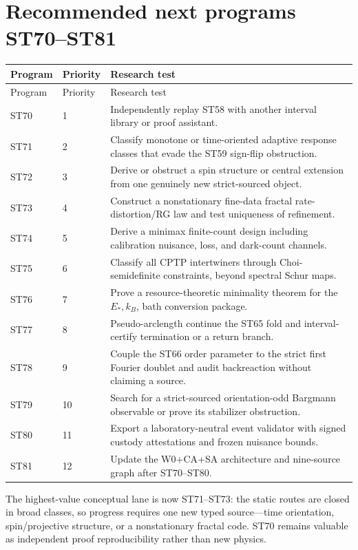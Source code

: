\documentclass[11pt,a4paper]{article}
\begin{document}
\section{Recommended next programs ST70--ST81}

\small
\begin{longtable}{@{}p{}p{}p{}@{}}
\toprule
Program & Priority & Research test\\
\midrule
\endfirsthead
\toprule
Program & Priority & Research test\\
\midrule
\endhead
ST70 & 1 & Independently replay ST58 with another interval library or proof assistant.\\
ST71 & 2 & Classify monotone or time-oriented adaptive response classes that evade the ST59 sign-flip obstruction.\\
ST72 & 3 & Derive or obstruct a spin structure or central extension from one genuinely new strict-sourced object.\\
ST73 & 4 & Construct a nonstationary fine-data fractal rate-distortion/RG law and test uniqueness of refinement.\\
ST74 & 5 & Derive a minimax finite-count design including calibration nuisance, loss, and dark-count channels.\\
ST75 & 6 & Classify all CPTP intertwiners through Choi-semidefinite constraints, beyond spectral Schur maps.\\
ST76 & 7 & Prove a resource-theoretic minimality theorem for the $E_*,k_B$, bath conversion package.\\
ST77 & 8 & Pseudo-arclength continue the ST65 fold and interval-certify termination or a return branch.\\
ST78 & 9 & Couple the ST66 order parameter to the strict first Fourier doublet and audit backreaction without claiming a source.\\
ST79 & 10 & Search for a strict-sourced orientation-odd Bargmann observable or prove its stabilizer obstruction.\\
ST80 & 11 & Export a laboratory-neutral event validator with signed custody attestations and frozen nuisance bounds.\\
ST81 & 12 & Update the W0+CA+SA architecture and nine-source graph after ST70--ST80.\\
\bottomrule
\end{longtable}
\normalsize

The highest-value conceptual lane is now ST71--ST73: the static routes are closed in broad classes, so progress requires one new typed source---time orientation, spin/projective structure, or a nonstationary fractal code. ST70 remains valuable as independent proof reproducibility rather than new physics.
\end{document}
